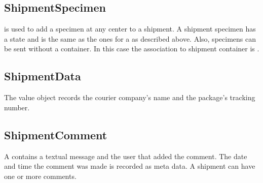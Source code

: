 \subsection*{ShipmentSpecimen}
 is used to add a specimen at any center to a
shipment.  A shipment specimen has a state and is the same as the ones for a
 as described above. Also, specimens can be sent
without a container. In this case the association to shipment container is
.

\subsection*{ShipmentData}
The  value object records the courier company's name
and the package's tracking number.

\subsection*{ShipmentComment}
A  contains a textual message and the user that
added the comment. The date and time the comment was made is recorded as meta
data. A shipment can have one or more comments.

